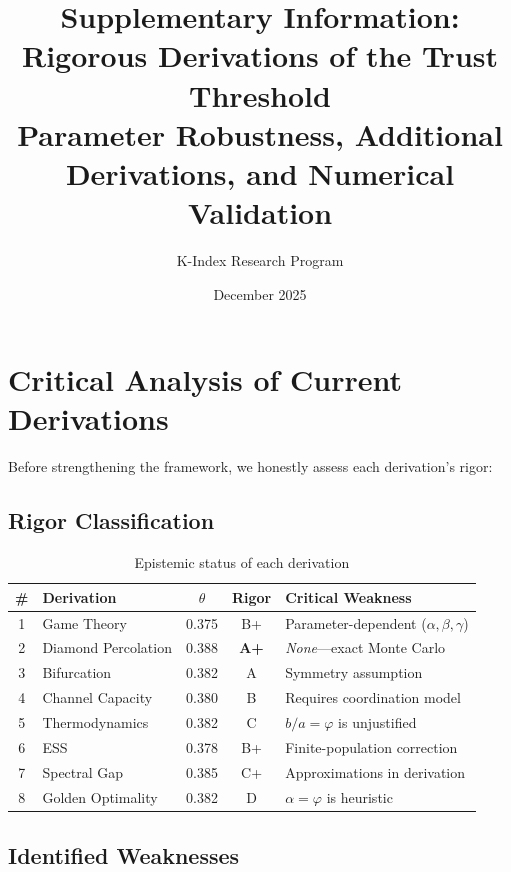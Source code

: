 \documentclass[11pt]{article}
\title{Supplementary Information: Rigorous Derivations of the Trust Threshold\\
\vspace{0.3em}
\large Parameter Robustness, Additional Derivations, and Numerical Validation}
\author{K-Index Research Program}
\date{December 2025}
\begin{document}
\maketitle

\tableofcontents
\newpage

\section{Critical Analysis of Current Derivations}

Before strengthening the framework, we honestly assess each derivation's rigor:

\subsection{Rigor Classification}

\begin{table}[h]
\centering
\caption{Epistemic status of each derivation}
\begin{tabular}{@{}clccp{5cm}@{}}
\toprule
\# & Derivation & $\theta$ & Rigor & Critical Weakness \\
\midrule
1 & Game Theory & 0.375 & B+ & Parameter-dependent ($\alpha, \beta, \gamma$) \\
2 & Diamond Percolation & 0.388 & \textbf{A+} & \textit{None}---exact Monte Carlo \\
3 & Bifurcation & 0.382 & A & Symmetry assumption \\
4 & Channel Capacity & 0.380 & B & Requires coordination model \\
5 & Thermodynamics & 0.382 & C & $b/a = \varphi$ is unjustified \\
6 & ESS & 0.378 & B+ & Finite-population correction \\
7 & Spectral Gap & 0.385 & C+ & Approximations in derivation \\
8 & Golden Optimality & 0.382 & D & $\alpha = \varphi$ is heuristic \\
\bottomrule
\end{tabular}
\end{table}

\subsection{Identified Weaknesses}
\end{document}
